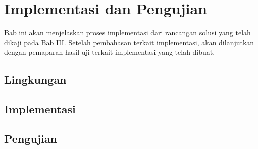 \chapter{Implementasi dan Pengujian}
Bab ini akan menjelaskan proses implementasi dari rancangan solusi yang telah dikaji pada Bab III. Setelah pembahasan terkait implementasi, akan dilanjutkan dengan pemaparan hasil uji terkait implementasi yang telah dibuat.

\section{Lingkungan}
\blindtext

\section{Implementasi}
\blindtext

\section{Pengujian}
\blindtext

